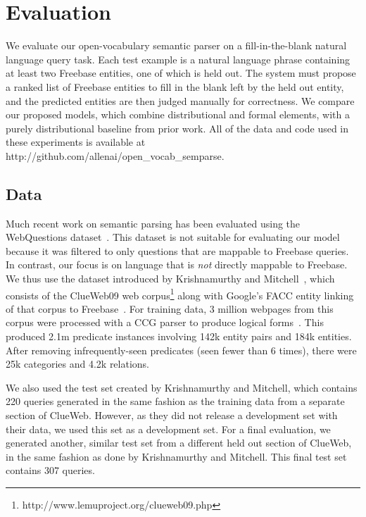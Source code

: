 \documentclass[11pt,letterpaper]{article}
\begin{document}
\section{Evaluation}
\label{sec:evaluation}

We evaluate our open-vocabulary semantic parser on a fill-in-the-blank natural language query task.
Each test example is a natural language phrase containing at least two Freebase entities, one of
which is held out.  The system must propose a ranked list of Freebase entities to fill in the blank
left by the held out entity, and the predicted entities are then judged manually for correctness.
We compare our proposed models, which combine distributional and formal elements, with a purely
distributional baseline from prior work.  All of the data and code used in these experiments is
available at http://github.com/allenai/open\_vocab\_semparse.

\subsection{Data}

Much recent work on semantic parsing has been evaluated using the WebQuestions
dataset~\cite{berant-2013-semantic-parsing-qa}.  This dataset is not suitable for evaluating our
model because it was filtered to only questions that are mappable to Freebase queries.  In
contrast, our focus is on language that is \emph{not} directly mappable to Freebase.  We thus use
the dataset introduced by Krishnamurthy and
Mitchell~, which consists of the ClueWeb09
web corpus\footnote{http://www.lemuproject.org/clueweb09.php} along with Google's FACC entity
linking of that corpus to Freebase~\cite{gabrilovich-2013-clueweb-entity-linking}.  For training
data, 3 million webpages from this corpus were processed with a CCG parser to produce logical
forms~\cite{krishnamurthy-2014-joint-ccg}.  This produced 2.1m predicate instances involving 142k
entity pairs and 184k entities.  After removing infrequently-seen predicates (seen fewer than 6
times), there were 25k categories and 4.2k relations.

We also used the test set created by Krishnamurthy and Mitchell, which contains 220 queries
generated in the same fashion as the training data from a separate section of ClueWeb.  However, as
they did not release a development set with their data, we used this set as a development set.  For
a final evaluation, we generated another, similar test set from a different held out section of
ClueWeb, in the same fashion as done by Krishnamurthy and Mitchell.  This final test set contains
307 queries.
\end{document}
